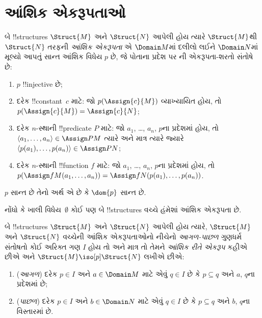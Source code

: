 \documentclass[../../../include/open-logic-section]{subfiles}
\begin{document}
\section{આંશિક એકરૂપતાઓ}

\begin{defn}
  બે !!{structure}s $\Struct{M}$ અને $\Struct{N}$ આપેલી હોય ત્યારે
  $\Struct{M}$થી $\Struct{N}$ તરફની \emph{આંશિક એકરૂપતા} એ
  $\Domain M$માં દલીલો લઈને $\Domain N$માં મૂલ્યો આપતું સાન્ત આંશિક
  વિધેય $p$ છે, જે પોતાના પ્રદેશ પર
  ની એકરૂપતા-શરતો સંતોષે છે:
  \begin{enumerate}
  \item $p$ !!{injective} છે;
  \item દરેક !!{constant}~$c$ માટે: જો $p(\Assign{c}{M})$
    વ્યાખ્યાયિત હોય, તો $p(\Assign{c}{M}) = \Assign{c}{N}$;
  \item દરેક $n$-સ્થાની !!{predicate} $P$ માટે: જો $a_1$, \dots,
    $a_n$, $p$ના પ્રદેશમાં હોય, તો $\langle a_1, \dots, a_n\rangle
    \in \Assign P M$ ત્યારે અને માત્ર ત્યારે જ્યારે
    $\langle p(a_1), \dots, p(a_n) \rangle \in \Assign P N$;
  \item દરેક $n$-સ્થાની !!{function} $f$ માટે: જો $a_1$, \dots,
    $a_n$, $p$ના પ્રદેશમાં હોય, તો $p(\Assign f M (a_1, \dots,a_n))
    = \Assign f N (p(a_1), \dots, p(a_n))$.
  \end{enumerate}
  $p$ સાન્ત છે તેનો અર્થ એ છે કે $\dom{p}$ સાન્ત છે.
\end{defn}

નોંધો કે ખાલી વિધેય~$\emptyset$ કોઈ પણ બે !!{structure}s વચ્ચે હંમેશાં
આંશિક એકરૂપતા છે.

\begin{defn}
  બે !!{structure}s $\Struct{M}$ અને $\Struct{N}$ આપેલી હોય ત્યારે,
  $\Struct{M}$ અને $\Struct{N}$ વચ્ચેની આંશિક એકરૂપતાઓનો નીચેનો
  \emph{આગળ-પાછળ} ગુણધર્મ સંતોષતો કોઈ અરિક્ત ગણ $I$ હોય તો અને માત્ર
  તો તેમને \emph{આંશિક રીતે એકરૂપ} કહીએ છીએ અને
  $\Struct{M} \iso[p] \Struct{N}$ લખીએ છીએ:
  \begin{enumerate}
  \item (\emph{આગળ}) દરેક $p \in I$ અને $a \in \Domain M$ માટે એવું
    $q \in I$ છે કે $p \subseteq q$ અને $a$, $q$ના પ્રદેશમાં છે;
  \item (\emph{પાછળ}) દરેક $p \in I$ અને $b \in \Domain N$ માટે એવું
    $q \in I$ છે કે $p \subseteq q$ અને $b$, $q$ના વિસ્તારમાં છે.
  \end{enumerate}
\end{defn}
\end{document}
